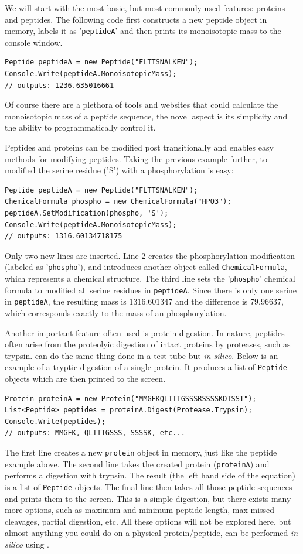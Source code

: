 We will start with the most basic, but most commonly used features: proteins and peptides. The following code first constructs a new peptide object in memory, labels it as '\texttt{peptideA}' and then prints its monoisotopic mass to the console window.
\begin{lstlisting}
Peptide peptideA = new Peptide("FLTTSNALKEN");
Console.Write(peptideA.MonoisotopicMass);
// outputs: 1236.635016661
\end{lstlisting}
Of course there are a plethora of tools and websites that could calculate the monoisotopic mass of a peptide sequence, the novel aspect is its simplicity and the ability to programmatically control it. 

Peptides and proteins can be modified post transitionally and \csmsl{} enables easy methods for modifying peptides. Taking the previous example further, to modified the serine residue ('S') with a phosphorylation is easy:
\begin{lstlisting}
Peptide peptideA = new Peptide("FLTTSNALKEN");
ChemicalFormula phospho = new ChemicalFormula("HPO3");
peptideA.SetModification(phospho, 'S');
Console.Write(peptideA.MonoisotopicMass);
// outputs: 1316.60134718175
\end{lstlisting}
Only two new lines are inserted. Line 2 creates the phosphorylation modification (labeled as '\texttt{phospho}'), and introduces another \csmsl{} object called \texttt{ChemicalFormula}, which represents a chemical structure. The third line sets the '\texttt{phospho}' chemical formula to modified all serine residues in \texttt{peptideA}. Since there is only one serine in \texttt{peptideA}, the resulting mass is $1316.601347$ and the difference is $79.96637$, which corresponds exactly to the mass of an phosphorylation.

Another important feature often used is protein digestion. In nature, peptides often arise from the proteolyic digestion of intact proteins by proteases, such as trypsin. \csmsl{} can do the same thing done in a test tube but \emph{in silico}. Below is an example of a tryptic digestion of a single protein. It produces a list of \texttt{Peptide} objects which are then printed to the screen.
\begin{lstlisting}
Protein proteinA = new Protein("MMGFKQLITTGSSSRSSSSKDTSST");
List<Peptide> peptides = proteinA.Digest(Protease.Trypsin);
Console.Write(peptides);
// outputs: MMGFK, QLITTGSSS, SSSSK, etc...
\end{lstlisting}
The first line creates a new \texttt{protein} object in memory, just like the peptide example above. The second line takes the created protein (\texttt{proteinA}) and performs a digestion with trypsin. The result (the left hand side of the equation) is a list of \texttt{Peptide} objects. The final line then takes all those peptide sequences and prints them to the screen. This is a simple digestion, but there exists many more options, such as maximum and minimum peptide length, max missed cleavages, partial digestion, etc. All these options will not be explored here, but almost anything you could do on a physical protein/peptide, can be performed \emph{in silico} using \csmsl{}.

